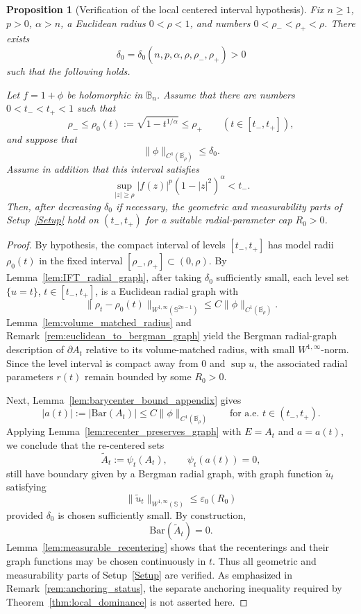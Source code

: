 \documentclass[11pt]{amsart}
\theoremstyle{plain}
\newtheorem{proposition}[theorem]{Proposition}
\theoremstyle{definition}
\theoremstyle{remark}
\newcommand{\B}{\mathbb{B}}
\newcommand{\Sn}{\mathbb{S}^{2n-1}}
\newcommand{\Sph}{\mathbb{S}}
\begin{document}
\begin{proposition}[Verification of the local centered interval hypothesis]\label{prop:verify_setup}
Fix \(n\ge 1\), \(p>0\), \(\alpha>n\), a Euclidean radius
$0<\rho<1$, and numbers $0<\rho_-<\rho_+<\rho$. There exists
\[
\delta_0=\delta_0(n,p,\alpha,\rho,\rho_-,\rho_+)>0
\]
such that the following holds.

Let \(f=1+\phi\) be holomorphic in \(\B_n\). Assume that there are numbers
$0<t_-<t_+<1$ such that
\[
\rho_-\le \rho_0(t):=\sqrt{1-t^{1/\alpha}}\le\rho_+
\qquad(t\in[t_-,t_+]),
\]
and suppose that
\[
\|\phi\|_{C^1(\overline{\B_{\rho}})}\le \delta_0.
\]
Assume in addition that this interval satisfies
\[
\sup_{|z|\ge\rho}|f(z)|^p(1-|z|^2)^\alpha<t_-.
\]
Then, after decreasing $\delta_0$ if necessary, the geometric and measurability
parts of Setup~\ref{Setup} hold on
\((t_-,t_+)\) for a suitable radial-parameter cap
$R_0>0$.
\end{proposition}

\begin{proof}
By hypothesis, the compact interval of levels $[t_-,t_+]$ has model radii
$\rho_0(t)$ in the fixed interval $[\rho_-,\rho_+]\subset(0,\rho)$.
By Lemma~\ref{lem:IFT_radial_graph}, after taking \(\delta_0\) sufficiently small, each level set \(\{u=t\}\),
\(t\in[t_-,t_+]\), is a Euclidean radial graph with
\[
\|\rho_t-\rho_0(t)\|_{W^{1,\infty}(\Sn)}
\le
C\|\phi\|_{C^1(\overline{\B_{\rho}})}.
\]
Lemma~\ref{lem:volume_matched_radius} and
Remark~\ref{rem:euclidean_to_bergman_graph} yield the Bergman radial-graph
description of \(\partial A_t\) relative to its volume-matched radius, with
small \(W^{1,\infty}\)-norm. Since the level interval is compact away from \(0\) and \(\sup u\), the associated
radial parameters \(r(t)\) remain bounded by some $R_0>0$.

Next, Lemma~\ref{lem:barycenter_bound_appendix} gives
\[
|a(t)|:=|\mathrm{Bar}(A_t)|
\le
C\|\phi\|_{C^1(\overline{\B_{\rho}})}
\qquad\text{for a.e. }t\in(t_-,t_+).
\]
Applying Lemma~\ref{lem:recenter_preserves_graph} with \(E=A_t\) and \(a=a(t)\), we conclude that the re-centered sets
\[
\widetilde A_t:=\psi_t(A_t),
\qquad
\psi_t(a(t))=0,
\]
still have boundary given by a Bergman radial graph, with graph function \(\widetilde u_t\) satisfying
\[
\|\widetilde u_t\|_{W^{1,\infty}(\Sph)}
\le
\varepsilon_0(R_0)
\]
provided \(\delta_0\) is chosen sufficiently small. By construction,
\[
\mathrm{Bar}(\widetilde A_t)=0.
\]
Lemma~\ref{lem:measurable_recentering} shows that the recenterings and their
graph functions may be chosen continuously in $t$. Thus all geometric and
measurability parts of Setup~\ref{Setup} are verified. As emphasized in
Remark~\ref{rem:anchoring_status}, the separate anchoring inequality required
by Theorem~\ref{thm:local_dominance} is not asserted here.
\end{proof}
\end{document}
